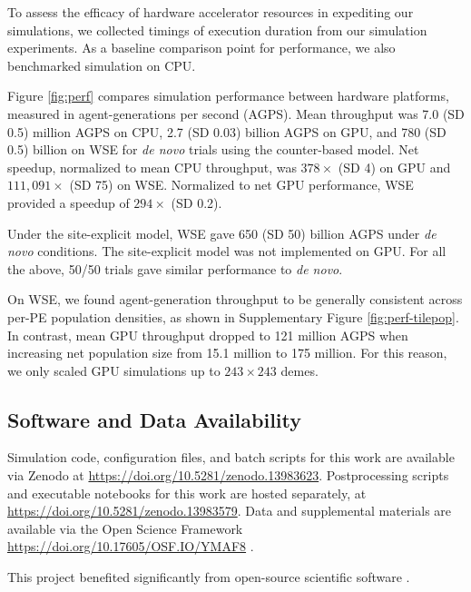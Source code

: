 

To assess the efficacy of hardware accelerator resources in expediting our simulations, we collected timings of execution duration from our simulation experiments.
As a baseline comparison point for performance, we also benchmarked simulation on CPU.

Figure \ref{fig:perf} compares simulation performance between hardware platforms, measured in agent-generations per second (AGPS).
Mean throughput was 7.0 (SD 0.5) million AGPS on CPU, 2.7 (SD 0.03) billion AGPS on GPU, and 780 (SD 0.5) billion on WSE for \textit{de novo} trials using the counter-based model.
Net speedup, normalized to mean CPU throughput, was $378\times$ (SD 4) on GPU and $111,091\times$ (SD 75) on WSE.
Normalized to net GPU performance, WSE provided a speedup of $294\times$ (SD 0.2).

Under the site-explicit model, WSE gave 650 (SD 50) billion AGPS under \textit{de novo} conditions.
The site-explicit model was not implemented on GPU.
For all the above, 50/50 trials gave similar performance to \textit{de novo}.

On WSE, we found agent-generation throughput to be generally consistent across per-PE population densities, as shown in Supplementary Figure \ref{fig:perf-tilepop}.
In contrast, mean GPU throughput dropped to 121 million AGPS when increasing net population size from 15.1 million to 175 million.
For this reason, we only scaled GPU simulations up to $243 \times 243$ demes.

\subsection{Software and Data Availability} \label{sec:materials}

Simulation code, configuration files, and batch scripts for this work are available via Zenodo at \url{https://doi.org/10.5281/zenodo.13983623}.
Postprocessing scripts and executable notebooks for this work are hosted separately, at \url{https://doi.org/10.5281/zenodo.13983579}.
Data and supplemental materials are available via the Open Science Framework \url{https://doi.org/10.17605/OSF.IO/YMAF8} \citep{foster2017open}.

This project benefited significantly from open-source scientific software \citep{2020SciPy-NMeth,harris2020array,reback2020pandas,mckinney-proc-scipy-2010,waskom2021seaborn,hunter2007matplotlib,moreno2023teeplot}.
